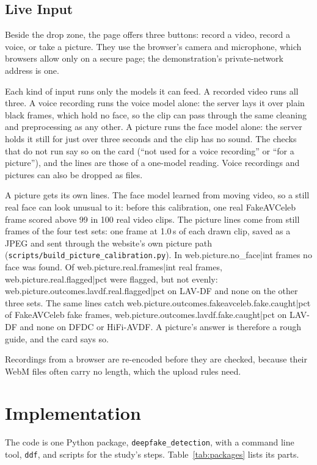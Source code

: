 \subsection{Live Input}
\label{sec:m-live}

Beside the drop zone, the page offers three buttons: record a video, record a
voice, or take a picture. They use the browser's camera and microphone, which
browsers allow only on a secure page; the demonstration's private-network
address is one.

Each kind of input runs only the models it can feed. A recorded video runs all
three. A voice recording runs the voice model alone: the server lays it over
plain black frames, which hold no face, so the clip can pass through the same
cleaning and preprocessing as any other. A picture runs the face model alone:
the server holds it still for just over three seconds and the clip has no
sound. The checks that do not run say so on the card (``not used for a voice
recording'' or ``for a picture''), and the lines are those of a one-model
reading. Voice recordings and pictures can also be dropped as files.

A picture gets its own lines. The face model learned from moving video, so
a still real face can look unusual to it: before this calibration, one real
FakeAVCeleb frame scored above 99 in 100 real video clips. The picture lines
come from still frames of the four test sets: one frame at 1.0\,s of each
drawn clip, saved as a JPEG and sent through the website's own picture path
(\texttt{scripts/build\_picture\_calibration.py}). In
{{web.picture.no_face|int}} frames no face was found. Of
{{web.picture.real.frames|int}} real frames, {{web.picture.real.flagged|pct}}
were flagged, but not evenly: {{web.picture.outcomes.lavdf.real.flagged|pct}} on
LAV-DF and none on the other three sets. The same lines catch
{{web.picture.outcomes.fakeavceleb.fake.caught|pct}} of FakeAVCeleb fake frames,
{{web.picture.outcomes.lavdf.fake.caught|pct}} on LAV-DF and none on DFDC or
HiFi-AVDF. A picture's answer is therefore a rough guide, and the card says so.

Recordings from a browser are re-encoded before they are checked, because
their WebM files often carry no length, which the upload rules need.

\section{Implementation}
\label{sec:m-impl}

The code is one Python package, \texttt{deepfake\_detection}, with a command
line tool, \texttt{ddf}, and scripts for the study's steps.
Table~\ref{tab:packages} lists its parts.

